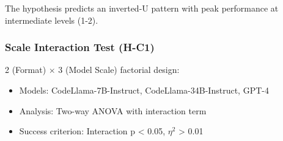 \begin{table}[htbp]
\centering
{}
\end{table}

The hypothesis predicts an inverted-U pattern with peak performance at intermediate levels (1-2).

\subsubsection{Scale Interaction Test (H-C1)}

2 (Format) $\times$ 3 (Model Scale) factorial design:

\begin{itemize}
\item Models: CodeLlama-7B-Instruct, CodeLlama-34B-Instruct, GPT-4
\item Analysis: Two-way ANOVA with interaction term
\item Success criterion: Interaction p < 0.05, $\eta^2$ > 0.01
\end{itemize}
